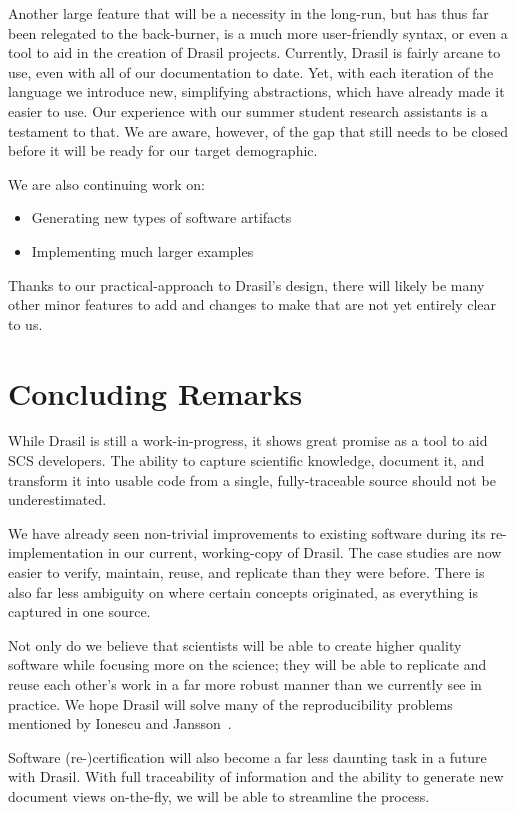 \documentclass[sigconf]{acmart}
\begin{document}
Another large feature that will be a necessity in the long-run, but has thus 
far been relegated to the back-burner, is a much more user-friendly syntax, or 
even a tool to aid in the creation of Drasil projects. Currently, Drasil is 
fairly arcane to use, even with all of our documentation to date. Yet, with 
each iteration of the language we introduce new, simplifying abstractions, 
which have already made it easier to use. Our experience with our summer student 
research assistants is a testament to that. We are aware, however, of the gap 
that still needs to be closed before it will be ready for our target 
demographic.

We are also continuing work on:
\begin{itemize}
	\item Generating new types of software artifacts
	\item Implementing much larger examples
\end{itemize}

Thanks to our practical-approach to Drasil's design, there will likely be many 
other minor features to add and changes to make that are not yet entirely clear 
to us.

\section{Concluding Remarks}

While Drasil is still a work-in-progress, it shows great promise as a tool to 
aid SCS developers. The ability to capture scientific knowledge, document it, 
and transform it into usable code from a single, fully-traceable source should 
not be underestimated.

We have already seen non-trivial improvements to existing software during its 
re-implementation in our current, working-copy of Drasil. The case studies are 
now easier to verify, maintain, reuse, and replicate than they were before. 
There is also far less ambiguity on where certain concepts originated, as 
everything is captured in one source.

Not only do we believe that scientists will be able to create higher quality 
software while focusing more on the science; they will 
be able to replicate and reuse each other's work in a far more robust manner 
than we currently see in practice. We hope Drasil will solve many of the 
reproducibility problems mentioned by Ionescu and 
Jansson~\cite{IonescuAndJansson2013}.

Software (re-)certification will also become a far less daunting task in a
future with Drasil. With full traceability of information and the ability to 
generate new document views on-the-fly, we will be able to streamline the 
process.
\end{document}
